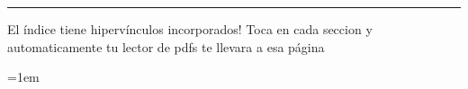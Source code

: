 \documentclass{article}
\begin{document}



\tableofcontents		\noindent\rule{\textwidth}{0.7pt }
El índice tiene hipervínculos incorporados!
Toca en cada seccion y automaticamente tu lector de pdfs te llevara a esa página







{
	\emergencystretch=1em %
	\printbibliography
}
\end{document}

